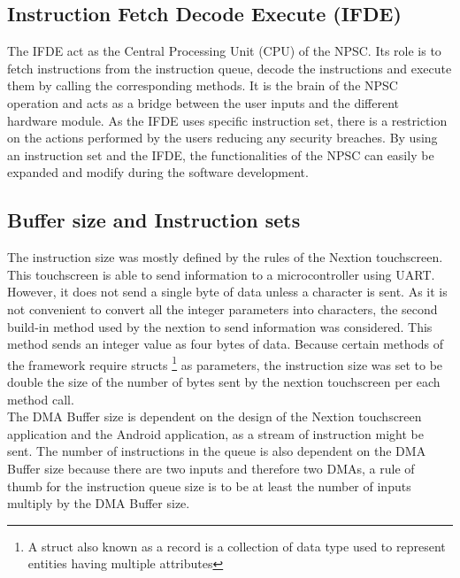 \subsection{Instruction Fetch Decode Execute (IFDE)}
The IFDE act as the Central Processing Unit (CPU) of the NPSC. Its role is to fetch instructions from the instruction queue, decode the instructions and execute them by calling the corresponding methods. It is the brain of the NPSC operation and acts as a bridge between the user inputs and the different hardware module. As the IFDE uses specific instruction set, there is a restriction on the actions performed by the users reducing any security breaches. By using an instruction set and the IFDE, the functionalities of the NPSC can easily be expanded and modify during the software development.
 
\subsection{Buffer size and Instruction sets}
The instruction size was mostly defined by the rules of the Nextion touchscreen. This touchscreen is able to send information to a microcontroller using UART. However, it does not send a single byte of data unless a character is sent. As it is not convenient to convert all the integer parameters into characters, the second build-in method used by the nextion to send information was considered. This method sends an integer value as four bytes of data. Because certain methods of the framework require structs \footnote{A struct also known as a record is a collection of data type used to represent entities having multiple attributes} as parameters, the instruction size was set to be double the size of the number of bytes sent by the nextion touchscreen per each method call. \\
The DMA Buffer size is dependent on the design of the Nextion touchscreen application and the Android application, as a stream of instruction might be sent. The number of instructions in the queue is also dependent on the DMA Buffer size because there are two inputs and therefore two DMAs, a rule of thumb for the instruction queue size is to be at least the number of inputs multiply by the DMA Buffer size.\\


